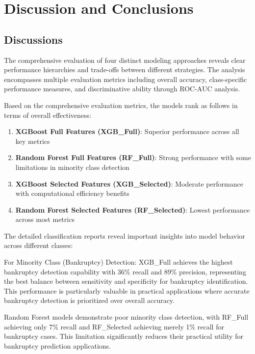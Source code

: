 \chapter{Discussion and Conclusions}

\section*{Discussions}

The comprehensive evaluation of four distinct modeling approaches reveals clear performance hierarchies and trade-offs between different strategies. The analysis encompasses multiple evaluation metrics including overall accuracy, class-specific performance measures, and discriminative ability through ROC-AUC analysis.

Based on the comprehensive evaluation metrics, the models rank as follows in terms of overall effectiveness:

\begin{enumerate}
    \item \textbf{XGBoost Full Features (XGB\_Full)}: Superior performance across all key metrics
    \item \textbf{Random Forest Full Features (RF\_Full)}: Strong performance with some limitations in minority class detection
    \item \textbf{XGBoost Selected Features (XGB\_Selected)}: Moderate performance with computational efficiency benefits
    \item \textbf{Random Forest Selected Features (RF\_Selected)}: Lowest performance across most metrics
\end{enumerate}

The detailed classification reports reveal important insights into model behavior across different classes:

For Minority Class (Bankruptcy) Detection:
XGB\_Full achieves the highest bankruptcy detection capability with 36\% recall and 89\% precision, representing the best balance between sensitivity and specificity for bankruptcy identification. This performance is particularly valuable in practical applications where accurate bankruptcy detection is prioritized over overall accuracy.

Random Forest models demonstrate poor minority class detection, with RF\_Full achieving only 7\% recall and RF\_Selected achieving merely 1\% recall for bankruptcy cases. This limitation significantly reduces their practical utility for bankruptcy prediction applications.

